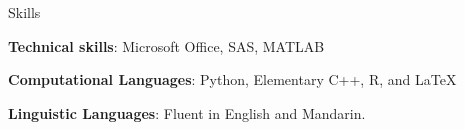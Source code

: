 \documentclass[
	11pt, %
]{resume} %
\begin{document}

	


\begin{rSection}{Skills}

	\item \textbf{Technical skills}: Microsoft Office, SAS, MATLAB
	\item \textbf{Computational Languages}: Python, Elementary C++, R, and \LaTeX
	\item \textbf{Linguistic Languages}: Fluent in English and Mandarin.
\end{rSection}






\end{document}
